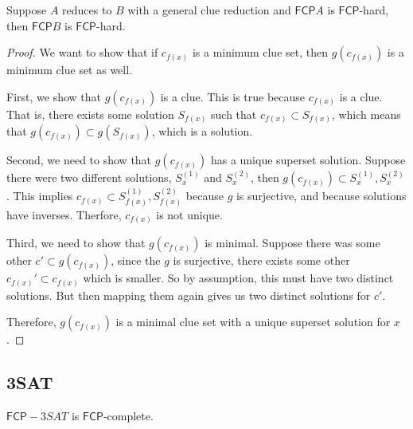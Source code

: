 \documentclass[runningheads,a4paper]{llncs}
\begin{document}
\begin{theorem}
Suppose $A$ reduces to $B$ with a general clue reduction and $\mathsf{FCP} A$ is $\mathsf{FCP}$-hard, then $\mathsf{FCP} B$ is $\mathsf{FCP}$-hard. 
\end{theorem}

\begin{proof}
We want to show that if $c_{f(x)}$ is a minimum clue set, then $g(c_{f(x)})$ is a minimum clue set as well.

First, we show that $g(c_{f(x)})$ is a clue. This is true because $c_{f(x)}$ is a clue. That is, there exists some solution $S_{f(x)}$ such that $c_{f(x)} \subset S_{f(x)}$, which means that $g(c_{f(x)}) \subset g(S_{f(x)})$, which is a solution.

Second, we need to show that $g(c_{f(x)})$ has a unique superset solution. Suppose there were two different solutions, $S_x^{(1)}$ and $S_{x}^{(2)}$, then $g(c_{f(x)}) \subset S_x^{(1)}, S_x^{(2)}$. This implies $c_{f(x)} \subset S_{f(x)}^{(1)}, S_{f(x)}^{(2)}$ because $g$ is surjective, and because solutions have inverses. Therfore, $c_{f(x)}$ is not unique.

Third, we need to show that $g(c_{f(x)})$ is minimal. Suppose there was some other $c' \subset g(c_{f(x)})$, since the $g$ is surjective, there exists some other $c_{f(x)}' \subset c_{f(x)}$ which is smaller. So by assumption, this must have two distinct solutions. But then mapping them again gives us two distinct solutions for $c'$. 

Therefore, $g(c_{f(x)})$ is a minimal clue set with a unique superset solution for $x$.
\end{proof}

\subsection{3SAT}

\begin{theorem}
$\mathsf{FCP}-3SAT$ is $\mathsf{FCP}$-complete. 
\end{theorem} 
\end{document}
